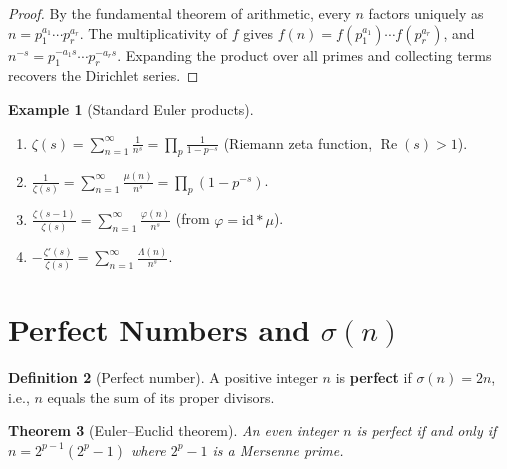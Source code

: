 \documentclass[12pt,a4paper,openany]{book}
\theoremstyle{definition}
\newtheorem{definition}{Definition}[chapter]
\newtheorem{example}[definition]{Example}
\theoremstyle{plain}
\newtheorem{theorem}[definition]{Theorem}
\theoremstyle{remark}
\begin{document}
\begin{proof}
By the fundamental theorem of arithmetic, every $n$ factors uniquely as
$n = p_1^{a_1}\cdots p_r^{a_r}$.  The multiplicativity of $f$ gives
$f(n) = f(p_1^{a_1})\cdots f(p_r^{a_r})$, and $n^{-s} = p_1^{-a_1 s}\cdots
p_r^{-a_r s}$.  Expanding the product over all primes and collecting terms
recovers the Dirichlet series.
\end{proof}

\begin{example}[Standard Euler products]\label{ex:euler-products}
\leavevmode
\begin{enumerate}[label=(\alph*)]
  \item $\displaystyle\zeta(s) = \sum_{n=1}^\infty \frac{1}{n^s}
         = \prod_p \frac{1}{1-p^{-s}}$ \quad (Riemann zeta function,
         $\operatorname{Re}(s) > 1$).
  \item $\displaystyle\frac{1}{\zeta(s)} = \sum_{n=1}^\infty \frac{\mu(n)}{n^s}
         = \prod_p (1 - p^{-s})$.
  \item $\displaystyle\frac{\zeta(s-1)}{\zeta(s)}
         = \sum_{n=1}^\infty \frac{\varphi(n)}{n^s}$
         \quad (from $\varphi = \mathrm{id}\ast\mu$).
  \item $\displaystyle -\frac{\zeta'(s)}{\zeta(s)}
         = \sum_{n=1}^\infty \frac{\Lambda(n)}{n^s}$.
\end{enumerate}
\end{example}

\section{Perfect Numbers and $\sigma(n)$}\label{sec:perfect-numbers}

\begin{definition}[Perfect number]\label{def:perfect-number}
A positive integer $n$ is \textbf{perfect}
if $\sigma(n) = 2n$, i.e., $n$ equals the sum of its proper divisors.
\end{definition}

\begin{theorem}[Euler--Euclid theorem]\label{thm:euler-euclid-perfect}
An even integer $n$ is perfect if and only if $n = 2^{p-1}(2^p - 1)$ where
$2^p - 1$ is a Mersenne prime.
\end{theorem}
\end{document}
